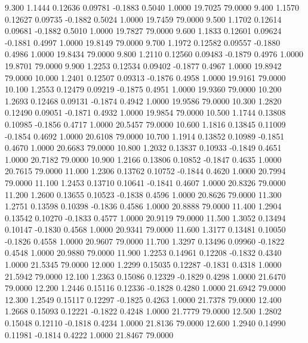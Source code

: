    9.300   1.1444   0.12636   0.09781  -0.1883   0.5040   1.0000  19.7025  79.0000
   9.400   1.1570   0.12627   0.09735  -0.1882   0.5024   1.0000  19.7459  79.0000
   9.500   1.1702   0.12614   0.09681  -0.1882   0.5010   1.0000  19.7827  79.0000
   9.600   1.1833   0.12601   0.09624  -0.1881   0.4997   1.0000  19.8149  79.0000
   9.700   1.1972   0.12582   0.09557  -0.1880   0.4986   1.0000  19.8434  79.0000
   9.800   1.2110   0.12560   0.09483  -0.1879   0.4976   1.0000  19.8701  79.0000
   9.900   1.2253   0.12534   0.09402  -0.1877   0.4967   1.0000  19.8942  79.0000
  10.000   1.2401   0.12507   0.09313  -0.1876   0.4958   1.0000  19.9161  79.0000
  10.100   1.2553   0.12479   0.09219  -0.1875   0.4951   1.0000  19.9360  79.0000
  10.200   1.2693   0.12468   0.09131  -0.1874   0.4942   1.0000  19.9586  79.0000
  10.300   1.2820   0.12490   0.09051  -0.1871   0.4932   1.0000  19.9854  79.0000
  10.500   1.1744   0.13808   0.10985  -0.1856   0.4717   1.0000  20.5457  79.0000
  10.600   1.1816   0.13845   0.11009  -0.1854   0.4692   1.0000  20.6108  79.0000
  10.700   1.1914   0.13852   0.10989  -0.1851   0.4670   1.0000  20.6683  79.0000
  10.800   1.2032   0.13837   0.10933  -0.1849   0.4651   1.0000  20.7182  79.0000
  10.900   1.2166   0.13806   0.10852  -0.1847   0.4635   1.0000  20.7615  79.0000
  11.000   1.2306   0.13762   0.10752  -0.1844   0.4620   1.0000  20.7994  79.0000
  11.100   1.2453   0.13710   0.10641  -0.1841   0.4607   1.0000  20.8326  79.0000
  11.200   1.2600   0.13655   0.10523  -0.1838   0.4596   1.0000  20.8626  79.0000
  11.300   1.2751   0.13598   0.10398  -0.1836   0.4586   1.0000  20.8888  79.0000
  11.400   1.2904   0.13542   0.10270  -0.1833   0.4577   1.0000  20.9119  79.0000
  11.500   1.3052   0.13494   0.10147  -0.1830   0.4568   1.0000  20.9341  79.0000
  11.600   1.3177   0.13481   0.10050  -0.1826   0.4558   1.0000  20.9607  79.0000
  11.700   1.3297   0.13496   0.09960  -0.1822   0.4548   1.0000  20.9880  79.0000
  11.900   1.2253   0.14961   0.12208  -0.1832   0.4340   1.0000  21.5345  79.0000
  12.000   1.2299   0.15035   0.12287  -0.1831   0.4318   1.0000  21.5942  79.0000
  12.100   1.2363   0.15086   0.12329  -0.1829   0.4298   1.0000  21.6470  79.0000
  12.200   1.2446   0.15116   0.12336  -0.1828   0.4280   1.0000  21.6942  79.0000
  12.300   1.2549   0.15117   0.12297  -0.1825   0.4263   1.0000  21.7378  79.0000
  12.400   1.2668   0.15093   0.12221  -0.1822   0.4248   1.0000  21.7779  79.0000
  12.500   1.2802   0.15048   0.12110  -0.1818   0.4234   1.0000  21.8136  79.0000
  12.600   1.2940   0.14990   0.11981  -0.1814   0.4222   1.0000  21.8467  79.0000
